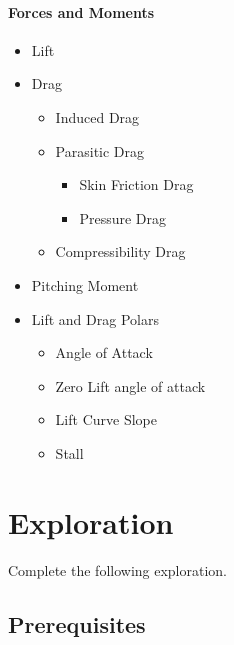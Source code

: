 \documentclass[11pt]{article}
\begin{document}
\paragraph{Forces and Moments}
\begin{itemize}
	\item Lift
	\item Drag
	\begin{itemize}
		\item Induced Drag
		\item Parasitic Drag
		\begin{itemize}
			\item Skin Friction Drag
			\item Pressure Drag
		\end{itemize}
		\item Compressibility Drag
	\end{itemize}
	\item Pitching Moment
	\item Lift and Drag Polars
	\begin{itemize}
		\item Angle of Attack
		\item Zero Lift angle of attack
		\item Lift Curve Slope
		\item Stall
	\end{itemize}
\end{itemize}




\section{Exploration}
\label{sec:exploration}

Complete the following exploration.

\subsection{Prerequisites}
\label{ssec:prereqs}
\end{document}
